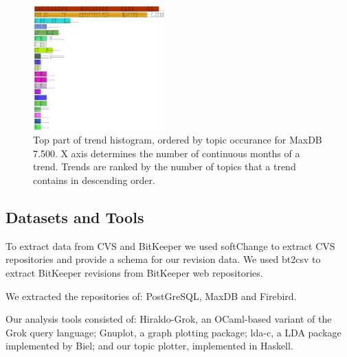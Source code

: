 \documentclass[times, 10pt,twocolumn]{article}
\begin{document}
\begin{figure}
  \centering
  \includegraphics[width=0.45\textwidth]{histogram-cropped-scaled}
  \caption{Top part of trend histogram, ordered by topic occurance for MaxDB 7.500. X axis determines the number of continuous months of a trend. Trends are ranked  by the number of topics that a trend contains in descending order.}       
  \label{fig:histogram}
\end{figure}


\subsection{Datasets and Tools}

To extract data from CVS and BitKeeper we used softChange to extract
CVS repositories and provide a schema for our revision data. We used
bt2csv to extract BitKeeper revisions from BitKeeper web repositories.

We extracted the repositories of: PostGreSQL, MaxDB and
Firebird.


Our analysis tools consisted of: Hiraldo-Grok, an OCaml-based variant
of the Grok query language; Gnuplot, a graph plotting package; lda-c,
a LDA package implemented by Biel; and our topic plotter, implemented
in Haskell.





\end{document}

